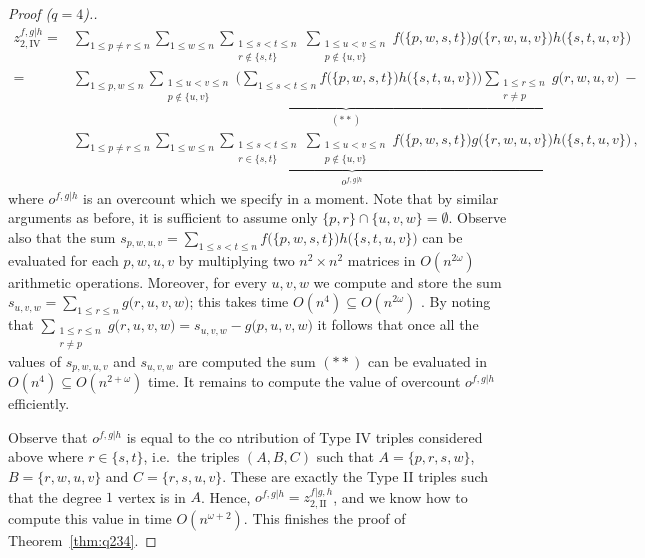 \documentclass{amsart}
\begin{document}
\begin{proof}[Proof ($q=4$).]
\[
\begin{split}
z_{2,\mathrm{IV}}^{f,g|h}
=& 
\sum_{1\leq p\ne r\leq n}
\sum_{1\leq w\leq n}
\sum_{\substack{1\leq s<t\leq n\\r\not\in\{s,t\}}}
\sum_{\substack{1\leq u<v\leq n\\p\not\in\{u,v\}}}
f\bigl(\{p,w,s,t\}\bigr)
g\bigl(\{r,w,u,v\}\bigr)
h\bigl(\{s,t,u,v\}\bigr)\\
=&
\underbrace{\sum_{1\leq p,w\leq n}
\sum_{\substack{1\leq u<v\leq n\\p\not\in\{u,v\}}}
\biggl(\sum_{1\leq s<t\leq n}
f\bigl(\{p,w,s,t\}\bigr)
h\bigl(\{s,t,u,v\}\bigr)
\biggr)
\sum_{\substack{1\le r\le n\\ r\ne p}}g\bigl(r,w,u,v\bigr)}_{(**)} \ -\\
& 
\underbrace{
\sum_{1\leq p\ne r\leq n}
\sum_{1\leq w\leq n}
\sum_{\substack{1\leq s<t\leq n\\r\in\{s,t\}}}
\sum_{\substack{1\leq u<v\leq n\\p\not\in\{u,v\}}}
f\bigl(\{p,w,s,t\}\bigr)
g\bigl(\{r,w,u,v\}\bigr)
h\bigl(\{s,t,u,v\}\bigr)}_{o^{f,g|h}}\,,
\end{split}
\]
where $o^{f,g|h}$ is an overcount which we specify in a moment.
Note that by similar arguments as before, it is sufficient to assume only $\{p,r\}\cap\{u,v,w\}=\emptyset$.
Observe also that the sum $s_{p,w,u,v}=\sum_{1\leq s<t\leq n}
f\bigl(\{p,w,s,t\}\bigr)
h\bigl(\{s,t,u,v\}\bigr)$ can be evaluated for each $p,w,u,v$ 
by multiplying two $n^2\times n^2$ matrices in $O(n^{2\omega})$ arithmetic operations.
Moreover, for every $u,v,w$ we compute and store the sum $s_{u,v,w}=\sum_{1\le r\le n}g\bigl(r,u,v,w\bigr)$; this takes time $O(n^4)\subseteq O(n^{2\omega})$ . 
By noting that $\sum_{\substack{1\le r\le n\\ r\ne p}}g\bigl(r,u,v,w\bigr)=s_{u,v,w}-g\bigl(p,u,v,w\bigr)$ it follows that once all the values of $s_{p,w,u,v}$ and $s_{u,v,w}$ are computed the sum $(**)$ can be evaluated in $O(n^4)\subseteq O(n^{2+\omega})$ time.
It remains to compute the value of overcount $o^{f,g|h}$ efficiently.

Observe that $o^{f,g|h}$ is equal to the co ntribution of Type IV triples considered above where $r\in\{s,t\}$, i.e.\ the triples $(A,B,C)$ such that $A=\{p,r,s,w\}$, $B=\{r,w,u,v\}$ and $C=\{r,s,u,v\}$. These are exactly the Type II triples such that the degree $1$ vertex is in $A$.
Hence, $o^{f,g|h}=z_{2,\mathrm{II}}^{f|g,h}$, and we know how to compute this value in time $O(n^{\omega+2})$.
This finishes the proof of Theorem~\ref{thm:q234}.
\end{proof}
\end{document}
